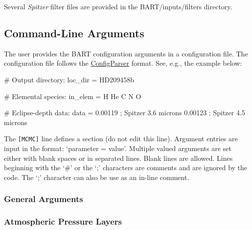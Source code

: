 \documentclass[letterpaper, 12pt]{article}
\begin{document}
Several {\em Spitzer} filter files are provided in the BART/inputs/filters directory.


\subsection{Command-Line Arguments}
\label{sec:configfile}

The user provides the BART configuration arguments in a configuration
file.  The configuration file follows the
\href{https://docs.python.org/2/library/configparser.html}{ConfigParser}
format.   See, e.g., the example below:

\begin{plain}
[MCMC]
# Output directory:
loc_dir = HD209458b

# Elemental species:
in_elem  = H He C N O

# Eclipse-depth data:
data   = 0.00119       ; Spitzer 3.6 microns
         0.00123       ; Spitzer 4.5 microns
\end{plain}

The {\tt[MCMC]} line defines a section (do not edit this line).
Argument entries are input in the format: {\tttb `parameter = value'}.
Multiple valued arguments are set either with blank spaces or in
separated lines.  Blank lines are allowed.  Lines beginning with the
{\tttb `\#'} or the {\tttb `;'} characters are comments and are ignored
by the code.  The {\tttb `;'} character can also be use as an in-line
comment.


\subsubsection{General Arguments}
\label{sec:CLAgen}


\subsubsection{Atmospheric Pressure Layers}
\label{sec:CLApress}
\end{document}
